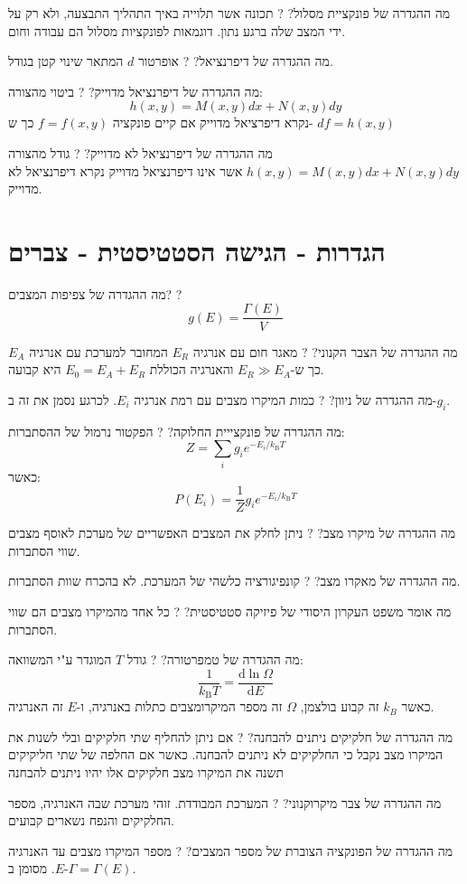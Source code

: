 \documentclass{tstextbook}
\begin{document}
מה ההגדרה של פונקציית מסלול?
?
תכונה אשר תלוייה באיך התהליך התבצעה, ולא רק על ידי המצב שלה ברגע נתון. דוגמאות לפונקציות מסלול הם עבודה וחום.

מה ההגדרה של דיפרנציאל?
?
אופרטור \(d\) המתאר שינוי קטן בגודל.

מה ההגדרה של דיפרנציאל מדוייק?
?
ביטוי מהצורה:
$$h(x,y)=M(x,y)dx+N(x,y)dy$$
נקרא דיפרציאל מדוייק אם קיים פונקציה \(f=f(x,y)\) כך ש- \(df=h(x,y)\)

מה ההגדרה של דיפרנציאל לא מדוייק?
?
גודל מהצורה \(h(x,y)=M(x,y)dx+N(x,y)dy\) אשר אינו דיפרנציאל מדוייק נקרא דיפרנציאל לא מדוייק.

\section{הגדרות - הגישה הסטטיסטית - צברים}

מה ההגדרה של צפיפות המצבים?
?
$$g(E)= \frac{\Gamma(E)}{V}$$

מה ההגדרה של הצבר הקנוני?
?
מאגר חום עם אנרגיה \(E_{R}\) המחובר למערכת עם אנרגיה \(E_{A}\) כך ש-\(E_{R}\gg E_{A}\) והאנרגיה הכוללת \(E_{0}=E_{A}+E_{R}\) היא קבועה.

מה ההגדרה של ניוון?
?
כמות המיקרו מצבים עם רמת אנרגיה \(E_{i}\). לכרגע נסמן את זה ב-\(g_{i}\).

מה ההגדרה של פונקצייית החלוקה?
?
הפקטור נרמול של ההסתברות:
$$Z=\sum_{i}g_{i}e^{-E_{i}/k_{\mathrm{{B}}}T}$$
כאשר:
$$ P(E_{i})={\frac{1}{Z}}g_{i}e^{-E_{i}/k_{\mathrm{B}}T}$$

מה ההגדרה של מיקרו מצב?
?
ניתן לחלק את המצבים האפשריים של מערכת לאוסף מצבים שווי הסתברות.

מה ההגדרה של מאקרו מצב?
?
קונפיגורציה כלשהי של המערכת. לא בהכרח שוות הסתברות.

מה אומר משפט העקרון היסודי של פיזיקה סטטיסטית?
?
כל אחד מהמיקרו מצבים הם שווי הסתברות.

מה ההגדרה של טמפרטורה?
?
גודל \(T\) המוגדר ע"י המשוואה:
$${\frac{1}{k_{\mathrm{B}}T}}={\frac{\mathrm{d}\ln\Omega}{\mathrm{d}E}}$$
כאשר \(k_{B}\) זה קבוע בולצמן, \(\Omega\) זה מספר המיקרומצבים כתלות באנרגיה, ו-\(E\) זה האנרגיה.

מה ההגדרה של חלקיקים ניתנים להבחנה?
?
אם ניתן להחליף שתי חלקיקים ובלי לשנות את המיקרו מצב נקבל כי החלקיקים לא ניתנים להבחנה. כאשר אם החלפה של שתי חליקיקים תשנה את המיקרו מצב חלקיקים אלו יהיו ניתנים להבחנה

מה ההגדרה של צבר מיקרוקנוני?
?
המערכת המבודדת. זוהי מערכת שבה האנרגיה, מספר החלקיקים והנפח נשארים קבועים.

מה ההגדרה של הפונקציה הצוברת של מספר המצבים?
?
מספר המיקרו מצבים עד האנרגיה \(E\). מסומן ב-\(\Gamma=\Gamma(E)\).
\end{document}
